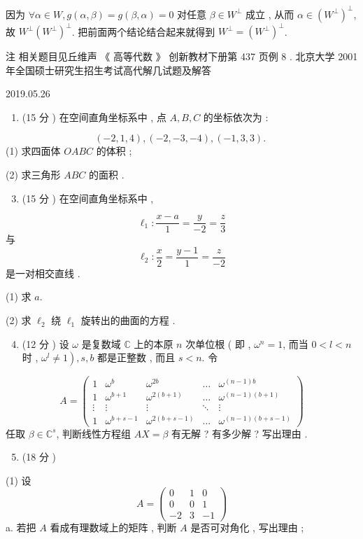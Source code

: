 \documentclass[10pt]{article}
\begin{document}
 因为  $\forall \alpha \in W, g(\alpha, \beta)=g(\beta, \alpha)=0$  对任意  $\beta \in W^{\perp}$  成立 ,  从而  $\alpha \in\left(W^{\perp}\right)^{\perp}$,  故  $W^{\perp}\left(W^{\perp}\right)^{\perp}$.  把前面两个结论结合起来就得到  $W^{\perp}=\left(W^{\perp}\right)^{\perp}$.

 注   相关题目见丘维声  《 高等代数 》 创新教材下册第  437  页例  8 .  北京大学  2001  年全国硕士研究生招生考试高代解几试题及解答 

   

2019.05.26

\begin{enumerate}
  \item (15  分 )  在空间直角坐标系中 ,  点  $A, B, C$  的坐标依次为 :
\end{enumerate}
$$
(-2,1,4),(-2,-3,-4),(-1,3,3) \text {. }
$$
(1)  求四面体  $O A B C$  的体积 ;

(2)  求三角形  $A B C$  的面积 .

\begin{enumerate}
  \setcounter{enumi}{2}
  \item (15  分 )  在空间直角坐标系中 ,
\end{enumerate}
$$
\ell_{1}: \frac{x-a}{1}=\frac{y}{-2}=\frac{z}{3}
$$
 与 
$$
\ell_{2}: \frac{x}{2}=\frac{y-1}{1}=\frac{z}{-2}
$$
 是一对相交直线 .

(1)  求  $a$.

(2)  求  $\ell_{2}$  绕  $\ell_{1}$  旋转出的曲面的方程 .

\begin{enumerate}
  \setcounter{enumi}{3}
  \item (12  分 )  设  $\omega$  是复数域  $\mathbb{C}$  上的本原  $n$  次单位根  ( 即 , $\omega^{n}=1$,  而当  $0<l<n$  时 , $\left.\omega^{l} \neq 1\right), s, b$  都是正整数 ,  而且  $s<n$.  令 
\end{enumerate}
$$
A=\left(\begin{array}{ccccc}
1 & \omega^{b} & \omega^{2 b} & \ldots & \omega^{(n-1) b} \\
1 & \omega^{b+1} & \omega^{2(b+1)} & \ldots & \omega^{(n-1)(b+1)} \\
\vdots & \vdots & \vdots & \ddots & \vdots \\
1 & \omega^{b+s-1} & \omega^{2(b+s-1)} & \ldots & \omega^{(n-1)(b+s-1)}
\end{array}\right)
$$
 任取  $\beta \in \mathbb{C}^{s}$,  判断线性方程组  $A X=\beta$  有无解 ?  有多少解 ?  写出理由 .

\begin{enumerate}
  \setcounter{enumi}{4}
  \item (18  分 )
\end{enumerate}
(1)  设 
$$
A=\left(\begin{array}{ccc}
0 & 1 & 0 \\
0 & 0 & 1 \\
-2 & 3 & -1
\end{array}\right)
$$
a.  若把  $A$  看成有理数域上的矩阵 ,  判断  $A$  是否可对角化 ,  写出理由 ;
\end{document}

